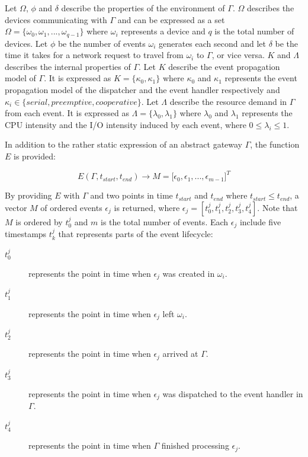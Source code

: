 Let $\Omega$, $\phi$ and $\delta$ describe the properties of the environment of
$\Gamma$. $\Omega$ describes the devices communicating with $\Gamma$ and can be
expressed as a set $\Omega = \{ \omega_0, \omega_1, ..., \omega_{q-1} \}$ where
$\omega_i$ represents a device and $q$ is the total number of devices. Let
$\phi$ be the number of events $\omega_i$ generates each second and let
$\delta$ be the time it takes for a network request to travel from $\omega_i$
to $\Gamma$, or vice versa. $K$ and $\Lambda$ describes the internal properties
of $\Gamma$. Let $K$ describe the event propagation model of $\Gamma$. It is
expressed as $K = \{ \kappa_0, \kappa_1 \}$ where $\kappa_0$ and $\kappa_1$
represents the event propagation model of the dispatcher and the event handler
respectively and $\kappa_i \in \{ \textit{serial}, \textit{preemptive},
\textit{cooperative} \}$. Let $\Lambda$ describe the resource demand in
$\Gamma$ from each event. It is expressed as $\Lambda = \{ \lambda_0, \lambda_1
\}$ where $\lambda_0$ and $\lambda_1$ represents the CPU intensity and the I/O
intensity induced by each event, where $0 \leq \lambda_i \leq 1$.

In addition to the rather static expression of an abstract gateway $\Gamma$,
the function $E$ is provided:

\begin{equation}
E(\Gamma, t_{start}, t_{end}) \to M = \big[ \epsilon_0, \epsilon_1, ...,
\epsilon_{m-1} \big]^T
\end{equation}

By providing $E$ with $\Gamma$ and two points in time $t_{start}$ and $t_{end}$
where $t_{start} \leq t_{end}$, a vector $M$ of ordered events $\epsilon_j$ is
returned, where $\epsilon_j = [ t_0^j, t_1^j, t_2^j, t_3^j, t_4^j ]$. Note that
$M$ is ordered by $t_0^j$ and $m$ is the total number of events. Each
$\epsilon_j$ include five timestamps $t_k^j$ that represents parts of the event
lifecycle:

\begin{description}
\item[$t_0^j$] represents the point in time when $\epsilon_j$ was created in
    $\omega_i$.
\item[$t_1^j$] represents the point in time when $\epsilon_j$ left $\omega_i$.
\item[$t_2^j$] represents the point in time when $\epsilon_j$ arrived at
    $\Gamma$.
\item[$t_3^j$] represents the point in time when $\epsilon_j$ was dispatched to
    the event handler in $\Gamma$.
\item[$t_4^j$] represents the point in time when $\Gamma$ finished processing
    $\epsilon_j$.
\end{description}


